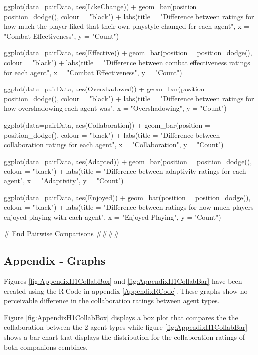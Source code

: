 \documentclass{IEEEtran}
\begin{document}
\begin{verbnobox}[\fontsize{10pt}{10pt}\selectfont]
ggplot(data=pairData, aes(LikeChange)) +
  geom_bar(position = position_dodge(), colour = "black") +
  labs(title = "Difference between ratings for how much the player liked that their own 
  playstyle 
  changed for each agent",
       x = "Combat Effectiveness", y = "Count")

ggplot(data=pairData, aes(Effective)) +
  geom_bar(position = position_dodge(), colour = "black") +
  labs(title = "Difference between combat effectiveness ratings for each agent",
       x = "Combat Effectiveness", y = "Count")

ggplot(data=pairData, aes(Overshadowed)) +
  geom_bar(position = position_dodge(), colour = "black") +
  labs(title = "Difference between ratings for how overshadowing each agent was",
       x = "Overshadowing", y = "Count")

ggplot(data=pairData, aes(Collaboration)) +
  geom_bar(position = position_dodge(), colour = "black") +
  labs(title = "Difference between collaboration ratings for each agent",
       x = "Collaboration", y = "Count")

ggplot(data=pairData, aes(Adapted)) +
  geom_bar(position = position_dodge(), colour = "black") +
  labs(title = "Difference between adaptivity ratings for each agent",
       x = "Adaptivity", y = "Count")

ggplot(data=pairData, aes(Enjoyed)) +
  geom_bar(position = position_dodge(), colour = "black") +
  labs(title = "Difference between ratings for how much players enjoyed playing with each
  agent",
       x = "Enjoyed Playing", y = "Count")

# End Pairwise Comparisons ####
\end{verbnobox}

\newpage

\subsection{Appendix - Graphs}


Figures \ref{fig:AppendixH1CollabBox} and \ref{fig:AppendixH1CollabBar} have been created using the R-Code in appendix \ref{AppendixRCode}. These graphs show no perceivable difference in the collaboration ratings between agent types.

Figure \ref{fig:AppendixH1CollabBox} displays a box plot that compares the the collaboration between the 2 agent types while figure \ref{fig:AppendixH1CollabBar} shows a bar chart that displays the distribution for the collaboration ratings of both companions combines.
\end{document}
